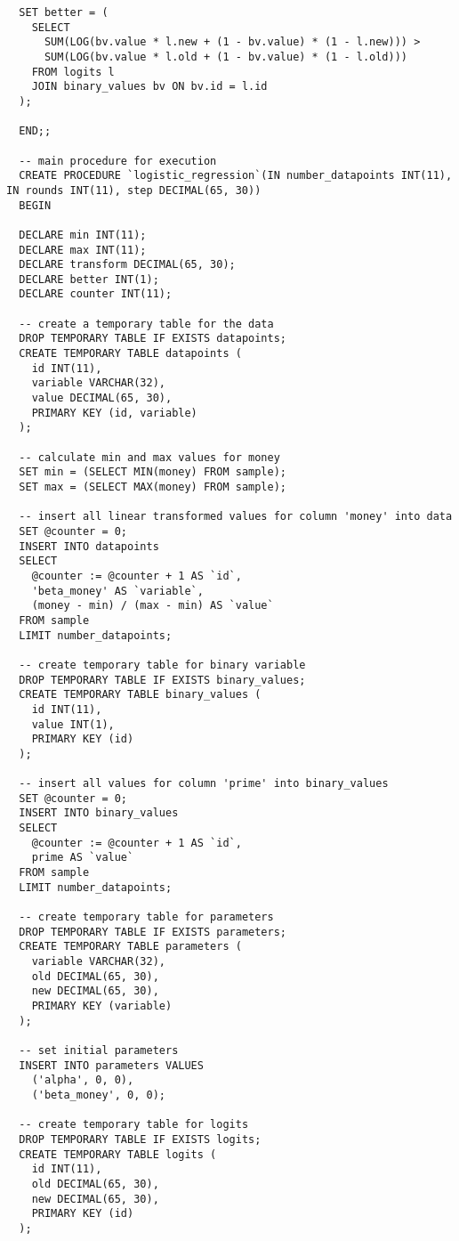 \begin{verbatim}
  SET better = (
    SELECT
      SUM(LOG(bv.value * l.new + (1 - bv.value) * (1 - l.new))) >
      SUM(LOG(bv.value * l.old + (1 - bv.value) * (1 - l.old)))
    FROM logits l
    JOIN binary_values bv ON bv.id = l.id
  );

  END;;

  -- main procedure for execution
  CREATE PROCEDURE `logistic_regression`(IN number_datapoints INT(11), IN rounds INT(11), step DECIMAL(65, 30))
  BEGIN

  DECLARE min INT(11);
  DECLARE max INT(11);
  DECLARE transform DECIMAL(65, 30);
  DECLARE better INT(1);
  DECLARE counter INT(11);

  -- create a temporary table for the data
  DROP TEMPORARY TABLE IF EXISTS datapoints;
  CREATE TEMPORARY TABLE datapoints (
    id INT(11),
    variable VARCHAR(32),
    value DECIMAL(65, 30),
    PRIMARY KEY (id, variable)
  );

  -- calculate min and max values for money
  SET min = (SELECT MIN(money) FROM sample);
  SET max = (SELECT MAX(money) FROM sample);

  -- insert all linear transformed values for column 'money' into data
  SET @counter = 0;
  INSERT INTO datapoints
  SELECT
    @counter := @counter + 1 AS `id`,
    'beta_money' AS `variable`,
    (money - min) / (max - min) AS `value`
  FROM sample
  LIMIT number_datapoints;

  -- create temporary table for binary variable
  DROP TEMPORARY TABLE IF EXISTS binary_values;
  CREATE TEMPORARY TABLE binary_values (
    id INT(11),
    value INT(1),
    PRIMARY KEY (id)
  );

  -- insert all values for column 'prime' into binary_values
  SET @counter = 0;
  INSERT INTO binary_values
  SELECT
    @counter := @counter + 1 AS `id`,
    prime AS `value`
  FROM sample
  LIMIT number_datapoints;

  -- create temporary table for parameters
  DROP TEMPORARY TABLE IF EXISTS parameters;
  CREATE TEMPORARY TABLE parameters (
    variable VARCHAR(32),
    old DECIMAL(65, 30),
    new DECIMAL(65, 30),
    PRIMARY KEY (variable)
  );

  -- set initial parameters
  INSERT INTO parameters VALUES
    ('alpha', 0, 0),
    ('beta_money', 0, 0);

  -- create temporary table for logits
  DROP TEMPORARY TABLE IF EXISTS logits;
  CREATE TEMPORARY TABLE logits (
    id INT(11),
    old DECIMAL(65, 30),
    new DECIMAL(65, 30),
    PRIMARY KEY (id)
  );


\end{verbatim}
